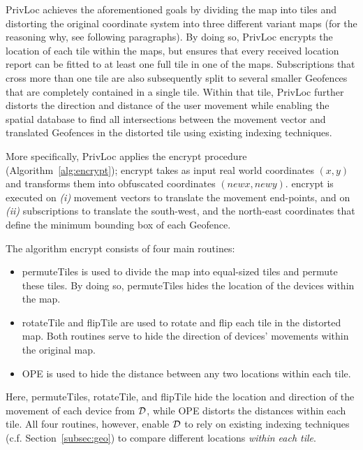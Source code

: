 \documentclass{llncs}
\newcommand\sol{{\sf PrivLoc}}
\newcommand\newx{\mathit{newx}}
\newcommand\newy{\mathit{newy}}
\begin{document}
\sol{} achieves the aforementioned goals by dividing the map into tiles and distorting the original coordinate system into three different variant maps (for the reasoning why, see following paragraphs).
By doing so, \sol{} encrypts the location of each tile within the maps, but ensures that every received location report can be fitted to at least one full tile in one of the maps. Subscriptions that cross more than one tile
are also subsequently split to several smaller Geofences that are completely contained in a single tile. Within that tile, \sol{} further distorts
the direction and distance of the user movement while enabling the spatial database to find all intersections between the movement vector and translated Geofences in the distorted tile using existing indexing techniques.

More specifically, \sol{} applies the {\sf encrypt} procedure (Algorithm~\ref{alg:encrypt}); {\sf encrypt} takes as input real world coordinates $(x,y)$ and transforms them into obfuscated coordinates $(\newx, \newy)$.
{\sf encrypt} is executed on \emph{(i)} movement vectors to translate the movement end-points, and on \emph{(ii)} subscriptions to translate the south-west, and the north-east coordinates that define the minimum bounding box of each Geofence.

The algorithm {\sf encrypt} consists of four main routines:
\begin{itemize}
\item {\sf permuteTiles} is used to divide the map into equal-sized tiles and permute these tiles. By doing so, {\sf permuteTiles} hides the location of the devices within the map.
\item {\sf rotateTile} and {\sf flipTile} are used to rotate and flip each tile in the distorted map. Both routines serve to hide the direction of devices' movements within the original map.
\item {\sf OPE} is used to hide the distance between any two locations within each tile.
\end{itemize}

Here, {\sf permuteTiles}, {\sf rotateTile}, and {\sf flipTile} hide the location and direction of the movement of each device from $\cal D$, while {\sf OPE} distorts the distances within each tile.
All four routines, however, enable $\cal D$ to rely on existing indexing techniques (c.f. Section~\ref{subsec:geo}) to compare different locations \emph{within each tile}. 
\end{document}
